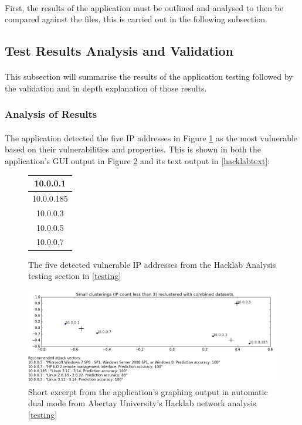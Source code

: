 \paragraph{}First, the results of the application must be outlined and analysed to then be compared against the files, this is carried out in the following subsection.
\subsection{Test Results Analysis and Validation}
\label{testresults}

\paragraph{}This subsection will summarise the results of the application testing followed by the validation and in depth explanation of those results.

\subsubsection{Analysis of Results}
\label{results_analysis}
\paragraph{}The application detected the five IP addresses in Figure \ref{ips} as the most vulnerable based on their vulnerabilities and properties. This is shown in both the application's GUI output in Figure \ref{results} and its text output in \ref{hacklabtext}: 

\begin{figure}
\label{ips}
\begin{center}
\begin{tabular}{ |c| }
\hline
10.0.0.1\\ \hline
10.0.0.185\\ \hline
10.0.0.3\\ \hline
10.0.0.5\\ \hline
10.0.0.7\\ \hline
\end{tabular}
\end{center}
\caption{The five detected vulnerable IP addresses from the Hacklab Analysis testing section in \ref{testing}}
\end{figure}


\begin{figure}[!h]
\centering
\includegraphics[width=6in]{./Figures/results.png}
\caption{Short excerpt from the application's graphing output in automatic dual mode from Abertay University's Hacklab network analysis \ref{testing}}
\label{results}
\end{figure}


